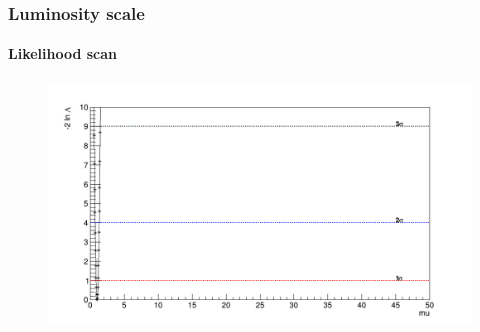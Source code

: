 \documentclass[11pt]{beamer}
\begin{document}
\begin{frame}
\frametitle{Luminosity scale}
\framesubtitle{Likelihood scan}
\begin{center}
	\begin{figure}
		\includegraphics[scale=0.25]{figures/3000fb/Likelihood.png}
	\end{figure}
\end{center}
\end{frame}
\end{document}
